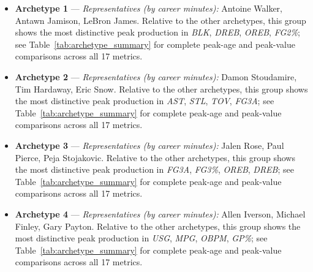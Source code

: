 \begin{itemize}
\item \textbf{Archetype 1} --- \emph{Representatives (by career minutes):} Antoine Walker, Antawn Jamison, LeBron James. Relative to the other archetypes, this group shows the most distinctive peak production in \textit{BLK}, \textit{DREB}, \textit{OREB}, \textit{FG2\%}; see Table~\ref{tab:archetype_summary} for complete peak-age and peak-value comparisons across all 17 metrics.
\item \textbf{Archetype 2} --- \emph{Representatives (by career minutes):} Damon Stoudamire, Tim Hardaway, Eric Snow. Relative to the other archetypes, this group shows the most distinctive peak production in \textit{AST}, \textit{STL}, \textit{TOV}, \textit{FG3A}; see Table~\ref{tab:archetype_summary} for complete peak-age and peak-value comparisons across all 17 metrics.
\item \textbf{Archetype 3} --- \emph{Representatives (by career minutes):} Jalen Rose, Paul Pierce, Peja Stojakovic. Relative to the other archetypes, this group shows the most distinctive peak production in \textit{FG3A}, \textit{FG3\%}, \textit{OREB}, \textit{DREB}; see Table~\ref{tab:archetype_summary} for complete peak-age and peak-value comparisons across all 17 metrics.
\item \textbf{Archetype 4} --- \emph{Representatives (by career minutes):} Allen Iverson, Michael Finley, Gary Payton. Relative to the other archetypes, this group shows the most distinctive peak production in \textit{USG}, \textit{MPG}, \textit{OBPM}, \textit{GP\%}; see Table~\ref{tab:archetype_summary} for complete peak-age and peak-value comparisons across all 17 metrics.
\end{itemize}

